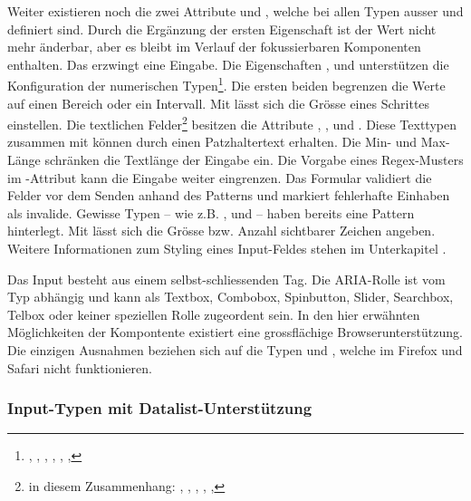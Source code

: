 Weiter existieren noch die zwei Attribute  und , welche bei allen Typen ausser  und  definiert sind. 
Durch die Ergänzung der ersten Eigenschaft ist der Wert nicht mehr änderbar, aber es bleibt im Verlauf der fokussierbaren Komponenten enthalten. 
Das  erzwingt eine Eingabe. 
Die Eigenschaften ,  und  unterstützen die Konfiguration der numerischen Typen\footnote{
    , , , , , , 
}. 
Die ersten beiden begrenzen die Werte auf einen Bereich oder ein Intervall. 
Mit  lässt sich die Grösse eines Schrittes einstellen. 
Die textlichen Felder\footnote{
    in diesem Zusammenhang: , , , , , 
} besitzen die Attribute , ,  und . 
Diese Texttypen zusammen mit  können durch  einen Patzhaltertext erhalten. 
Die Min- und Max-Länge schränken die Textlänge der Eingabe ein. 
Die Vorgabe eines Regex-Musters im -Attribut kann die Eingabe weiter eingrenzen. 
Das Formular validiert die Felder vor dem Senden anhand des Patterns und markiert fehlerhafte Einhaben als invalide. 
Gewisse Typen – wie z.B. ,  und  – haben bereits eine Pattern hinterlegt. 
Mit  lässt sich die Grösse bzw. Anzahl sichtbarer Zeichen angeben. 
Weitere Informationen zum Styling eines Input-Feldes stehen im Unterkapitel \textbf{}. 

Das Input besteht aus einem selbst-schliessenden Tag. 
Die ARIA-Rolle ist vom Typ abhängig und kann als Textbox, Combobox, Spinbutton, Slider, Searchbox, Telbox oder keiner speziellen Rolle zugeordent sein. 
In den hier erwähnten Möglichkeiten der Kompontente existiert eine grossflächige Browserunterstützung. 
Die einzigen Ausnahmen beziehen sich auf die Typen  und , welche im Firefox und Safari nicht funktionieren. 


\subsubsection{{\color{dgray} Input-Typen mit Datalist-Unterstützung}}
\label{sec:inputTypesDatalist}

